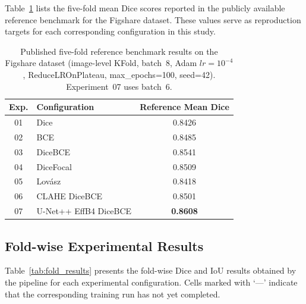 \documentclass[a4paper,12pt]{article}
\begin{document}
Table~\ref{tab:reference_results} lists the five-fold mean Dice scores reported in the publicly
available reference benchmark for the Figshare dataset. These values serve as reproduction
targets for each corresponding configuration in this study.

\begin{table}[htbp]
\centering
\caption{Published five-fold reference benchmark results on the Figshare dataset (image-level
KFold, batch~8, Adam $lr=10^{-4}$, ReduceLROnPlateau, max\_epochs=100, seed=42). Experiment~07
uses batch~6.}
\label{tab:reference_results}
\renewcommand{\arraystretch}{1.3}
\begin{tabular}{|c|l|c|}
\hline
\textbf{Exp.} & \textbf{Configuration} & \textbf{Reference Mean Dice} \\ \hline
01 & Dice             & 0.8426 \\ \hline
02 & BCE              & 0.8485 \\ \hline
03 & DiceBCE          & 0.8541 \\ \hline
04 & DiceFocal        & 0.8509 \\ \hline
05 & Lovász           & 0.8418 \\ \hline
06 & CLAHE DiceBCE    & 0.8501 \\ \hline
07 & U-Net++ EffB4 DiceBCE & \textbf{0.8608} \\ \hline
\end{tabular}
\end{table}

\subsection{Fold-wise Experimental Results}
\label{sub:fold_results}

Table~\ref{tab:fold_results} presents the fold-wise Dice and IoU results obtained by the
pipeline for each experimental configuration. Cells marked with `---' indicate that the
corresponding training run has not yet completed.
\end{document}
